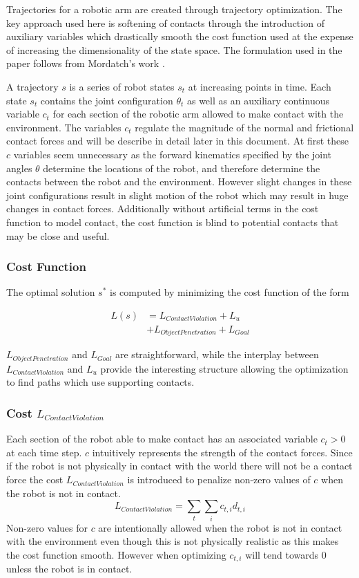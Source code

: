 \documentclass[../thesis.tex]{subfiles}
\begin{document}
Trajectories for a robotic arm are created through trajectory optimization. The key approach used here is softening of contacts through the introduction of auxiliary variables which drastically smooth the cost function used at the expense of increasing the dimensionality of the state space. The formulation used in the paper follows from Mordatch's work \cite{Mordatch2012}.

A trajectory $s$ is a series of robot states $s_t$ at increasing points in time. Each state $s_t$ contains the joint configuration $\theta_t$ as well as an auxiliary continuous variable $c_t$ for each section of the robotic arm allowed to make contact with the environment. The variables $c_t$ regulate the magnitude of the normal and frictional contact forces and will be describe in detail later in this document. At first these $c$ variables seem unnecessary as the forward kinematics specified by the joint angles $\theta$ determine the locations of the robot, and therefore determine the contacts between the robot and the environment. However slight changes in these joint configurations result in slight motion of the robot which may result in huge changes in contact forces. Additionally without artificial terms in the cost function to model contact, the cost function is blind to potential contacts that may be close and useful. 

\subsubsection{Cost Function}
The optimal solution $s^*$ is computed by minimizing the cost function of the form

\begin{align*}
L(s) &= L_{Contact Violation} + L_{u} \\
&+ L_{Object Penetration} + L_{Goal}   
\end{align*}
    
$L_{Object Penetration}$ and $L_{Goal}$ are straightforward, while the interplay between $L_{Contact Violation}$ and $L_u$ provide the interesting structure allowing the optimization to find paths which use supporting contacts.




\subsubsection{Cost $L_{Contact Violation}$}
Each section of the robot able to make contact has an associated variable $c_t > 0$ at each time step. $c$ intuitively represents the strength of the contact forces. Since if the robot is not physically in contact with the world there will not be a contact force the cost $L_{Contact Violation}$ is introduced to penalize non-zero values of $c$ when the robot is not in contact. 
$$L_{Contact Violation} = \sum_t{\sum_i{c_{t,i} d_{t,i}}}$$
Non-zero values for $c$ are intentionally allowed when the robot is not in contact with the environment even though this is not physically realistic as this makes the cost function smooth. However when optimizing $c_{t,i}$ will tend towards 0 unless the robot is in contact.
\end{document}
